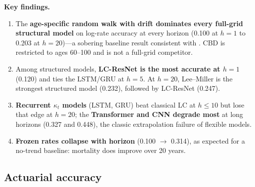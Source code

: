 \documentclass[11pt,a4paper]{article}
\begin{document}
\noindent\textbf{Key findings.}
\begin{enumerate}
    \item The \textbf{age-specific random walk with drift dominates every full-grid structural model} on log-rate accuracy at every horizon (0.100 at $h{=}1$ to 0.203 at $h{=}20$)---a sobering baseline result consistent with \citet{booth2006demographic}. CBD is restricted to ages 60--100 and is not a full-grid competitor.
    \item Among structured models, \textbf{LC-ResNet is the most accurate at $h{=}1$} (0.120) and ties the LSTM/GRU at $h{=}5$. At $h{=}20$, Lee--Miller is the strongest structured model (0.232), followed by LC-ResNet (0.247).
    \item \textbf{Recurrent $\kappa_t$ models} (LSTM, GRU) beat classical LC at $h \le 10$ but lose that edge at $h{=}20$; the \textbf{Transformer and CNN degrade most} at long horizons (0.327 and 0.448), the classic extrapolation failure of flexible models.
    \item \textbf{Frozen rates collapse with horizon} (0.100 $\to$ 0.314), as expected for a no-trend baseline: mortality does improve over 20 years.
\end{enumerate}

\subsection{Actuarial accuracy}
\end{document}
